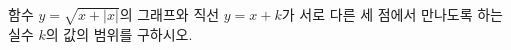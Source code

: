 \hspace*{2mm}\begin{minipage}[t]{\dimexpr\linewidth-2mm\relax}\vspace{0pt}
함수 $y=\sqrt{x+|x|}$의 그래프와 직선 $y=x+k$가 서로 다른 세 점에서 만나도록 하는 실수 $k$의 값의 범위를 구하시오.\end{minipage}
